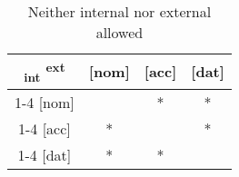 \begin{table}[H]
  \center
  \caption{Neither internal nor external allowed}
  \begin{tabular}{c|c|c|c}
    \toprule
    \textsubscript{\ac{int}} \textsuperscript{\ac{ext}}
           & [\ac{nom}]
           & [\ac{acc}]
           & [\ac{dat}]
           \\ \cmidrule{1-4}
       [\ac{nom}]
           & \xcancel{\phantom{xx}}
           & *
           & *
           \\ \cmidrule{1-4}
       [\ac{acc}]
           & *
           & \xcancel{\phantom{xx}}
           & *
           \\ \cmidrule{1-4}
       [\ac{dat}]
           & *
           & *
           & \xcancel{\phantom{xx}}
           \\
     \bottomrule
  \end{tabular}
    \label{tbl:case-competition-none-typology}
\end{table}







